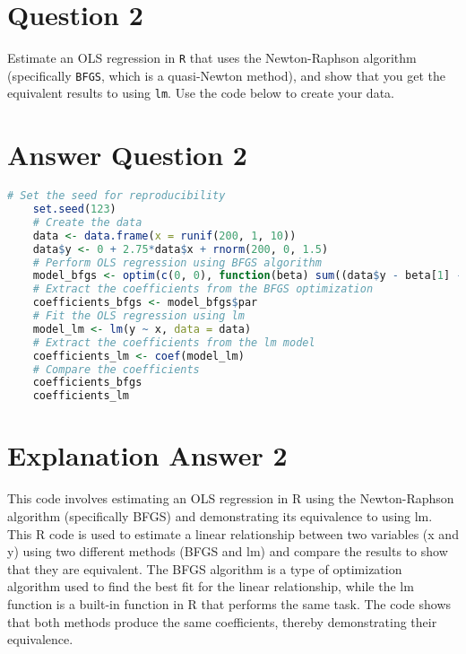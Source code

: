 \documentclass[12pt,letterpaper]{article}
\begin{document}
\section*{Question 2}
\noindent Estimate an OLS regression in \texttt{R} that uses the Newton-Raphson algorithm (specifically \texttt{BFGS}, which is a quasi-Newton method), and show that you get the equivalent results to using \texttt{lm}. Use the code below to create your data.
\vspace{.5cm}
 

	\section*{Answer Question 2}

\begin{lstlisting}[language=R]
	# Set the seed for reproducibility
	set.seed(123)
	# Create the data
	data <- data.frame(x = runif(200, 1, 10))
	data$y <- 0 + 2.75*data$x + rnorm(200, 0, 1.5)
	# Perform OLS regression using BFGS algorithm
	model_bfgs <- optim(c(0, 0), function(beta) sum((data$y - beta[1] - beta[2]*data$x)^2), method = "BFGS")
	# Extract the coefficients from the BFGS optimization
	coefficients_bfgs <- model_bfgs$par
	# Fit the OLS regression using lm
	model_lm <- lm(y ~ x, data = data)
	# Extract the coefficients from the lm model
	coefficients_lm <- coef(model_lm)
	# Compare the coefficients
	coefficients_bfgs
	coefficients_lm
\end{lstlisting}

\vspace{.25cm}
\section*{Explanation Answer 2} 
\vspace{.25cm}
\noindent This code involves estimating an OLS regression in R using the Newton-Raphson algorithm (specifically BFGS) and demonstrating its equivalence to using lm.
This R code is used to estimate a linear relationship between two variables (x and y) using two different methods (BFGS and lm) and compare the results to show that they are equivalent. The BFGS algorithm is a type of optimization algorithm used to find the best fit for the linear relationship, while the lm function is a built-in function in R that performs the same task. The code shows that both methods produce the same coefficients, thereby demonstrating their equivalence.
\end{document}
